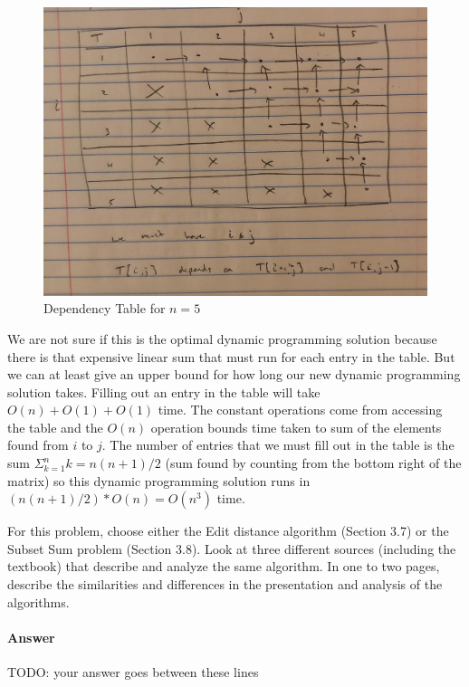 \documentclass{article}
\begin{document}
\begin{enumerate}
        \begin{figure}
            \begin{center}
                \includegraphics[scale=0.1]{image0}
                \caption{Dependency Table for $n=5$}
    		    \label{fig:dynprog}
            \end{center}
        \end{figure}

        We are not sure if this is the optimal dynamic programming solution because there is that expensive linear sum that must run for each entry in the table.
        But we can at least give an upper bound for how long our new dynamic programming solution takes.
        Filling out an entry in the table will take $O (n) + O(1) + O(1)$ time.
        The constant operations come from accessing the table and the $O(n)$ operation bounds time taken to sum of the elements found from $i$ to $j$.
        The number of entries that we must fill out in the table is the sum $\Sigma _{k=1}^n k = n(n+1)/2$ (sum found by counting from the bottom right of the matrix) so this dynamic programming solution runs in $(n(n+1)/2) * O (n) = O(n^3)$ time.
\end{enumerate}


\nextprob
{}

For this problem, choose either the Edit distance algorithm (Section 3.7) or the
Subset Sum problem (Section 3.8). Look at three different sources (including the
textbook) that describe
and analyze the same algorithm. In one to two pages, describe the similarities
and differences in the presentation and analysis of the algorithms.

\paragraph{Answer}


TODO: your answer goes between these lines

\end{document}
